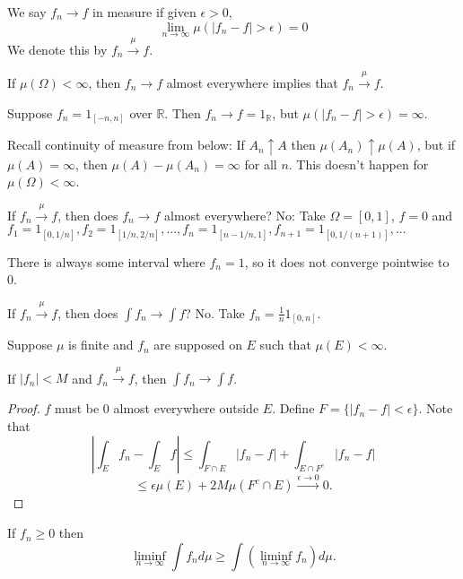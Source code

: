 \documentclass[11pt]{scrartcl}
\newcommand{\R}{\mathbb{R}}
\begin{document}
\begin{definition} We say $f_n \rightarrow f$ in measure if given $\epsilon > 0$, $$\lim_{n \rightarrow \infty} \mu\left (|f_n - f| > \epsilon\right ) = 0$$  We denote this by $f_n \xrightarrow{\mu} f$.
\end{definition}
\begin{exercise} If $\mu(\Omega) < \infty$, then $f_n \rightarrow f$ almost everywhere implies that $f_n \xrightarrow{\mu} f$.
\end{exercise}
\begin{example} Suppose $f_n = 1_{[-n, n]}$ over $\R$.  Then $f_n \rightarrow f = 1_{\R}$, but $\mu(|f_n - f| > \epsilon) = \infty$.

Recall continuity of measure from below: If $A_n \uparrow A$ then $\mu(A_n) \uparrow \mu(A)$, but if $\mu(A) = \infty$, then $\mu(A) - \mu(A_n) = \infty$ for all $n$.  This doesn't happen for $\mu(\Omega) < \infty$.
\end{example}
\begin{example} If $f_n \xrightarrow{\mu} f$, then does $f_n \rightarrow f$ almost everywhere?  No:  Take $\Omega = [0, 1]$, $f = 0$ and $f_1 = 1_{[0, 1/n]}, f_2 = 1_{[1/n, 2/n]}, ..., f_n = 1_{[n-1/n, 1]}, f_{n+1} = 1_{[0, 1/(n+1)]}, ...$

There is always some interval where $f_n = 1$, so it does not converge pointwise to $0$.
\end{example}
\begin{example} If $f_n \xrightarrow{\mu} f$, then does $\int f_n \rightarrow \int f$?  No.
Take $f_n = \frac{1}{n}1_{[0, n]}$.  
\end{example}
\begin{thm} Suppose $\mu$ is finite and $f_n$ are supposed on $E$ such that $\mu(E)  < \infty$.

If $|f_n| < M$ and $f_n \xrightarrow{\mu} f$, then $\int f_n \rightarrow \int f$.
\end{thm}
\begin{proof}
$f$ must be $0$ almost everywhere outside $E$.  Define $F = \{|f_n - f| < \epsilon\}$.  Note that 
$$\left |\int_E f_n - \int_E f\right | \le \int_{F \cap E} |f_n - f| + \int_{E\cap F^c} |f_n - f|$$
$$\le \epsilon \mu(E) + 2M\mu(F^c \cap E) \xrightarrow{\epsilon \rightarrow 0} 0.$$
\end{proof}
\begin{thm} If $f_n \ge 0$ then
$$\liminf_{n \rightarrow \infty} \int f_n d\mu \ge \int \left (\liminf_{n \rightarrow \infty} f_n\right )d\mu.$$
\end{thm}
\end{document}
